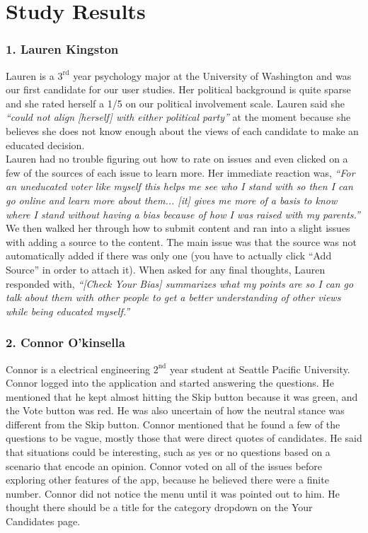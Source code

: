 \documentclass[11pt]{article}
\begin{document}
\section*{Study Results}

\subsubsection{1. Lauren Kingston}

Lauren is a $3^{\text{rd}}$ year psychology major at the University of Washington and was our first candidate for our user studies. Her political background is quite sparse and she rated herself a 1/5 on our political involvement scale. Lauren said she {\em``could not align [herself] with either political party''} at the moment because she believes she does not know enough about the views of each candidate to make an educated decision.\\[-9pt]

Lauren had no trouble figuring out how to rate on issues and even clicked on a few of the sources of each issue to learn more. Her immediate reaction was, {\em ``For an uneducated voter like myself this helps me see who I stand with so then I can go online and learn more about them... [it] gives me more of a basis to know where I stand without having a bias because of how I was raised with my parents.''} We then walked her through how to submit content and ran into a slight issues with adding a source to the content. The main issue was that the source was not automatically added if there was only one (you have to actually click ``Add Source'' in order to attach it). When asked for any final thoughts, Lauren responded with, {\em``[Check Your Bias] summarizes what my points are so I can go talk about them with other people to get a better understanding of other views while being educated myself.''}

\subsubsection{2. Connor O'kinsella}

Connor is a electrical engineering $2^{\text{nd}}$ year student at Seattle Pacific University. Connor logged into the application and started answering the questions. He mentioned that he kept almost hitting the Skip button because it was green, and the Vote button was red. He was also uncertain of how the neutral stance was different from the Skip button. Connor mentioned that he found a few of the questions to be vague, mostly those that were direct quotes of candidates. He said that situations could be interesting, such as yes or no questions based on a scenario that encode an opinion. Connor voted on all of the issues before exploring other features of the app, because he believed there were a finite number. Connor did not notice the menu until it was pointed out to him. He thought there should be a title for the category dropdown on the Your Candidates page.
\end{document}
